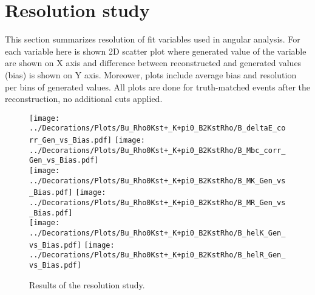 \section{Resolution study}
\label{sec:Res}
This section summarizes resolution of fit variables used in angular analysis. For each variable here is shown 2D scatter plot where generated value of the variable are shown on X axis and difference between reconstructed and generated values (bias) is shown on Y axis. Moreower, plots include average bias and resolution per bins of generated values. All plots are done for truth-matched events after the reconstruction, no additional cuts applied.
\begin{figure}[p]
\centering
\texttt{[image: ../Decorations/Plots/Bu\_Rho0Kst+\_K+pi0\_B2KstRho/B\_deltaE\_corr\_Gen\_vs\_Bias.pdf]}\hfil
\texttt{[image: ../Decorations/Plots/Bu\_Rho0Kst+\_K+pi0\_B2KstRho/B\_Mbc\_corr\_Gen\_vs\_Bias.pdf]}\\
\texttt{[image: ../Decorations/Plots/Bu\_Rho0Kst+\_K+pi0\_B2KstRho/B\_MK\_Gen\_vs\_Bias.pdf]}\hfil
\texttt{[image: ../Decorations/Plots/Bu\_Rho0Kst+\_K+pi0\_B2KstRho/B\_MR\_Gen\_vs\_Bias.pdf]}\\
\texttt{[image: ../Decorations/Plots/Bu\_Rho0Kst+\_K+pi0\_B2KstRho/B\_helK\_Gen\_vs\_Bias.pdf]}\hfill
\texttt{[image: ../Decorations/Plots/Bu\_Rho0Kst+\_K+pi0\_B2KstRho/B\_helR\_Gen\_vs\_Bias.pdf]}\\
\caption{Results of the resolution study.}
\end{figure}
\clearpage
